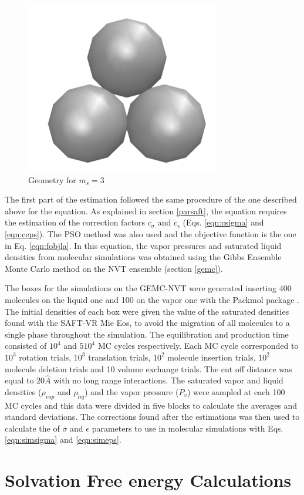 \begin{figure}[th]
	\centering
	\includegraphics[width=0.15\linewidth]{Figures/fe3}
	\caption{Geometry for $m_{s}=3$}
	\label{fig:fen3}
\end{figure}

The first part of the estimation followed the same procedure of the one described above for the  equation. As explained in section \ref{parsaft}, the  equation requires the estimation of the correction factors $c_{\sigma}$ and $c_{\epsilon}$ (Eqs. \eqref{eqn:csigma} and \eqref{eqn:ceps}). The PSO method was also used and the objective function is the one in Eq. \eqref{eqn:fobjla}. In this equation, the vapor pressures and saturated liquid densities from molecular simulations was obtained using the Gibbs Ensemble Monte Carlo method on the NVT ensemble  (section \ref{gemc}).

The boxes for the simulations on the GEMC-NVT were generated inserting 400 molecules on the liquid one and 100 on the vapor one with the Packmol package \cite{packmol}. The initial densities of each box were given the value of the saturated densities found with the SAFT-VR Mie Eos, to avoid the migration of all molecules to a single phase throughout the simulation. The equilibration and production time consisted of $10^{4}$ and $5 10^{4}$ MC cycles respectively. Each MC cycle corresponded to $10^3$ rotation trials, $10^3$ translation trials, $10^2$ molecule insertion trials, $10^2$ molecule deletion trials and 10 volume exchange trials. The cut off distance was equal to $20 \hat{A}$ with no long range interactions. The saturated vapor and liquid densities ($\rho_{vap}$ and $\rho_{liq}$) and the vapor pressure ($P_{v}$) were sampled at each 100 MC cycles and this data were divided in five blocks to calculate the averages and standard deviations. The corrections found after the estimations was then used to calculate the of $\sigma$ and $\epsilon$ parameters to use in molecular simulations with Eqs. \eqref{eqn:simsigma} and \eqref{eqn:simeps}.

\section{Solvation Free energy Calculations}

